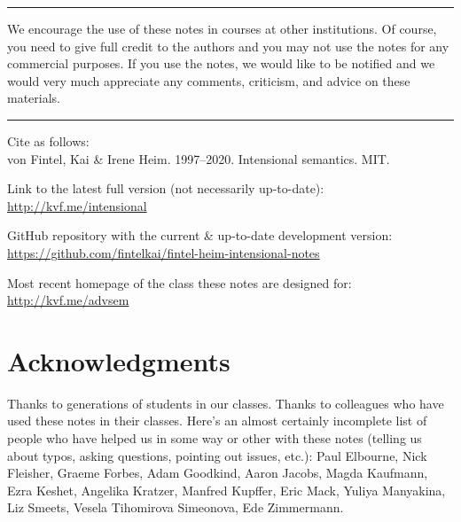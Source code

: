 \plainbreak{1} 

We encourage the use of these notes in courses at other institutions. Of course,
you need to give full credit to the authors and you may not use the notes for
any commercial purposes. If you use the notes, we would like to be notified and
we would very much appreciate any comments, criticism, and advice on these
materials.

\plainbreak{1}

Cite as follows: \\
von Fintel, Kai \& Irene Heim. 1997--2020. Intensional semantics. MIT.

\medskip

\noindent Link to the latest full version (not necessarily up-to-date):\\
\url{http://kvf.me/intensional}

\medskip
                                            
\noindent GitHub repository with the current \& up-to-date development version:\\
\url{https://github.com/fintelkai/fintel-heim-intensional-notes}

\medskip

\noindent Most recent homepage of the class these notes are designed for:\\
\url{http://kvf.me/advsem}

\clearpage

\vspace*{\fill}

\section*{Acknowledgments}

Thanks to generations of students in our classes. Thanks to colleagues who have
used these notes in their classes. Here's an almost certainly incomplete list of
people who have helped us in some way or other with these notes (telling us
about typos, asking questions, pointing out issues, etc.): Paul Elbourne, Nick
Fleisher, Graeme Forbes, Adam Goodkind, Aaron Jacobs, Magda Kaufmann, Ezra
Keshet, Angelika Kratzer, Manfred Kupffer, Eric Mack, Yuliya Manyakina, Liz
Smeets, Vesela Tihomirova Simeonova, Ede Zimmermann.

